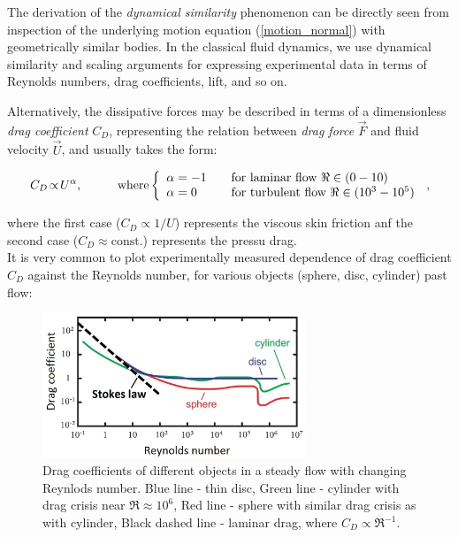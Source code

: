 The derivation of the \textit{dynamical similarity} phenomenon can be directly seen from inspection of the underlying motion equation (\ref{motion_normal}) with geometrically similar bodies. In the classical fluid dynamics, we use dynamical similarity and scaling arguments for expressing experimental data in terms of Reynolds numbers, drag coefficients, lift, and so on.

Alternatively, the dissipative forces may be described in terms of a dimensionless \textit{drag coefficient} $C_D$, representing the relation between \textit{drag force} $\vec{F}$ and fluid velocity $\vec{U}$, and usually takes the form:

$$
C_D \!\propto\! U^\alpha, \hspace{1cm}
\text{where}
\left\{
  \begin{array}{l l}
    \alpha=-1 & \quad \text{for laminar flow $\Re \in (0-10)$}\\
    \alpha=0 & \quad \text{for turbulent flow $\Re \in (10^3-10^5)$}
  \end{array}
\right.\,,
$$

where the first case ($C_D \propto 1/U$) represents the viscous skin friction anf the second case ($C_D \approx \text{const.}$) represents the pressu drag.\\
It is very common to plot experimentally measured dependence of drag coefficient $C_D$ against the Reynolds number, for various objects (sphere, disc, cylinder) past flow:

\begin{figure}[h]
	\centering
	\includegraphics[width=0.7\textwidth]{graphics/theory/C-Re}
	\caption{Drag coefficients of different objects in a steady flow with changing Reynlods number. Blue line - thin disc, Green line - cylinder with drag crisis near $\Re \approx 10^6$, Red line - sphere with similar drag crisis as with cylinder, Black dashed line - laminar drag, where $C_D \propto \Re^{-1}$.}
	\label{C-Re}
\end{figure}

